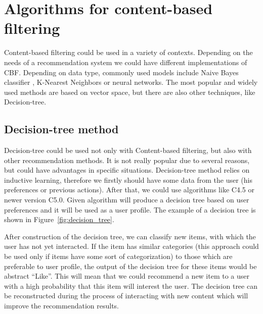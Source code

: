 \section{Algorithms for content-based filtering}\label{sec:cbf_algorithms}
Content-based filtering could be used in a variety of contexts. Depending on the needs of a recommendation system we could have different implementations of CBF. Depending on data type, commonly used models include Naive Bayes classifier \cite{Naive_classifier}, K-Nearest Neighbors or neural networks.  The most popular and widely used methods are based on vector space, but there are also other techniques, like Decision-tree.

\subsection{Decision-tree method}
Decision-tree could be used not only with Content-based filtering, but also with other recommendation methods. It is not really popular due to several reasons, but could have advantages in specific situations. Decision-tree method relies on inductive learning, therefore we firstly should have some data from the user (his preferences or previous actions). After that, we could use algorithms like C4.5\cite{C4_5} or newer version C5.0. Given algorithm will produce a decision tree based on user preferences and it will be used as a user profile. The example of a decision tree is shown in Figure~\ref{fig:decision_tree}\cite{Decision_Tree}.

After construction of the decision tree, we can classify new items, with which the user has not yet interacted. If the item has similar categories (this approach could be used only if items have some sort of categorization) to those which are preferable to user profile, the output of the decision tree for these items would be abstract “Like”. This will mean that we could recommend a new item to a user with a high probability that this item will interest the user. The decision tree can be reconstructed during the process of interacting with new content which will improve the recommendation results.

